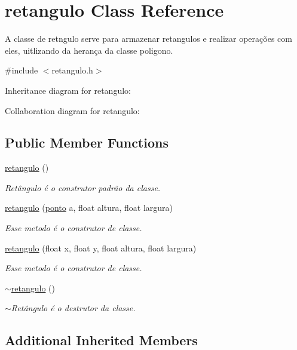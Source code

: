 \hypertarget{classretangulo}{}\section{retangulo Class Reference}
\label{classretangulo}


A classe de retngulo serve para armazenar retangulos e realizar operações com eles, uitlizando da herança da classe poligono.  




{\ttfamily \#include $<$retangulo.\+h$>$}



Inheritance diagram for retangulo\+:


Collaboration diagram for retangulo\+:
\subsection*{Public Member Functions}
\begin{DoxyCompactItemize}
\item 
\hyperlink{classretangulo_a628a3793054ccfe3dd33cec3bb499987}{retangulo} ()
\begin{DoxyCompactList}\small\item\em Retângulo é o construtor padrão da classe. \end{DoxyCompactList}\item 
\hyperlink{classretangulo_a5fe1629422a5e7d01a5051835a712e10}{retangulo} (\hyperlink{classponto}{ponto} a, float altura, float largura)
\begin{DoxyCompactList}\small\item\em Esse metodo é o construtor de classe. \end{DoxyCompactList}\item 
\hyperlink{classretangulo_a8eb54a4aa37bc9f02e08bc62fd02bb52}{retangulo} (float x, float y, float altura, float largura)
\begin{DoxyCompactList}\small\item\em Esse metodo é o construtor de classe. \end{DoxyCompactList}\item 
\hyperlink{classretangulo_ac6983b03c4614484a72ac04c13d7f556}{$\sim$retangulo} ()
\begin{DoxyCompactList}\small\item\em $\sim$\+Retângulo é o destrutor da classe. \end{DoxyCompactList}\end{DoxyCompactItemize}
\subsection*{Additional Inherited Members}


